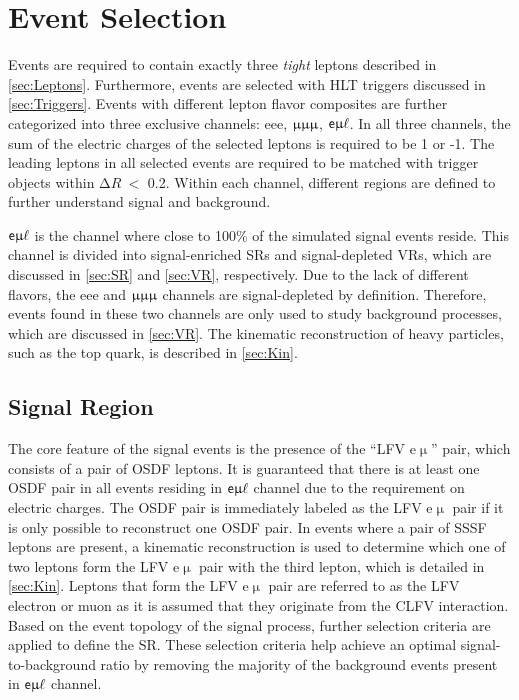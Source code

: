 \chapter{Event Selection}
\label{chap:Selection}

Events are required to contain exactly three \emph{tight} leptons described in \autoref{sec:Leptons}. Furthermore, events are selected with \ac{HLT} triggers discussed in \autoref{sec:Triggers}. Events with different lepton flavor composites are further categorized into three exclusive channels: eee, $\upmu\upmu\upmu$, $\textsf{e}\upmu\ell$. In all three channels, the sum of the electric charges of the selected leptons is required to be 1 or -1. The leading leptons in all selected events are required to be matched with trigger objects within $\mathrm{\Delta} R~<$ 0.2. Within each channel, different regions are defined to further understand signal and background.

$\textsf{e}\upmu\ell$ is the channel where close to 100\% of the simulated signal events reside. This channel is divided into signal-enriched \acp{SR} and signal-depleted \acp{VR}, which are discussed in \autoref{sec:SR} and \autoref{sec:VR}, respectively. Due to the lack of different flavors, the eee and $\upmu\upmu\upmu$ channels are signal-depleted by definition. Therefore, events found in these two channels are only used to study background processes, which are discussed in \autoref{sec:VR}. The kinematic reconstruction of heavy particles, such as the top quark, is described in \autoref{sec:Kin}.
\section{Signal Region}
\label{sec:SR}

The core feature of the signal events is the presence of the ``LFV e$\upmu$'' pair, which consists of a pair of \ac{OSDF} leptons. It is guaranteed that there is at least one \ac{OSDF} pair in all events residing in $\textsf{e}\upmu\ell$ channel due to the requirement on electric charges. The \ac{OSDF} pair is immediately labeled as the LFV e$\upmu$ pair if it is only possible to reconstruct one \ac{OSDF} pair. In events where a pair of \ac{SSSF} leptons are present, a kinematic reconstruction is used to determine which one of two leptons form the LFV e$\upmu$ pair with the third lepton, which is detailed in \autoref{sec:Kin}. Leptons that form the LFV e$\upmu$ pair are referred to as the LFV electron or muon as it is assumed that they originate from the \ac{CLFV} interaction. Based on the event topology of the signal process, further selection criteria are applied to define the \ac{SR}. These selection criteria help achieve an optimal signal-to-background ratio by removing the majority of the background events present in $\textsf{e}\upmu\ell$ channel. 

